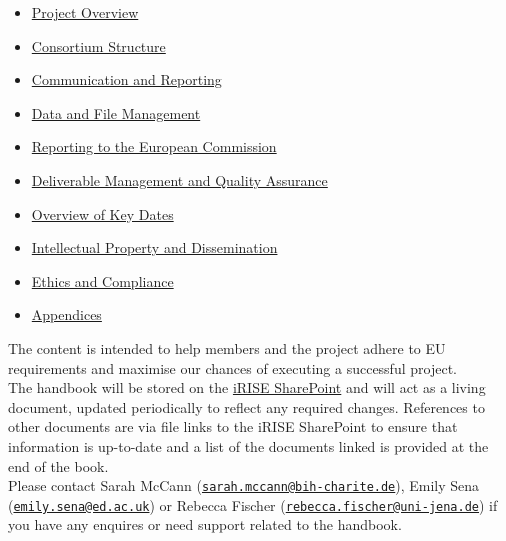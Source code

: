 \documentclass[
]{article}
\providecommand{\tightlist}{%
  \setlength{\itemsep}{0pt}\setlength{\parskip}{0pt}}
\begin{document}
\begin{itemize}
\tightlist
\item
  \protect\hyperlink{project-overview}{Project Overview}\\
\item
  \protect\hyperlink{consortium-structure}{Consortium Structure}\\
\item
  \protect\hyperlink{communication-and-reporting}{Communication and Reporting}\\
\item
  \protect\hyperlink{data-and-file-management}{Data and File Management}\\
\item
  \protect\hyperlink{reporting-to-the-european-commission}{Reporting to the European Commission}\\
\item
  \protect\hyperlink{deliverable-management-and-quality-assurance}{Deliverable Management and Quality Assurance}\\
\item
  \protect\hyperlink{overview-of-key-dates}{Overview of Key Dates}\\
\item
  \protect\hyperlink{intellectual-property-and-dissemination}{Intellectual Property and Dissemination}\\
\item
  \protect\hyperlink{ethics-and-compliance}{Ethics and Compliance}\\
\item
  \protect\hyperlink{appendix-1-ethical-self-assessment-and-ethical-risks-identification}{Appendices}
\end{itemize}

The content is intended to help members and the project adhere to EU requirements and maximise our chances of executing a successful project.\\
The handbook will be stored on the \href{https://charitede.sharepoint.com/sites/iRISE/Shared\%20Documents/Forms/AllItems.aspx}{iRISE SharePoint} and will act as a living document, updated periodically to reflect any required changes. References to other documents are via file links to the iRISE SharePoint to ensure that information is up-to-date and a list of the documents linked is provided at the end of the book.\\
Please contact Sarah McCann (\href{mailto:sarah.mccann@bih-charite.de}{\nolinkurl{sarah.mccann@bih-charite.de}}), Emily Sena (\href{mailto:emily.sena@ed.ac.uk}{\nolinkurl{emily.sena@ed.ac.uk}}) or Rebecca Fischer (\href{mailto:rebecca.fischer@uni-jena.de}{\nolinkurl{rebecca.fischer@uni-jena.de}}) if you have any enquires or need support related to the handbook.
\end{document}
